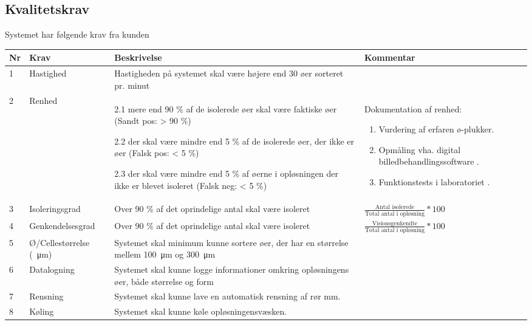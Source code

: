 \subsection{Kvalitetskrav}
\label{subsec:Kvalitetskrav}
Systemet har følgende krav fra kunden
\begin{center}
		\begin{longtable}{ | m{0.5cm} | m{3cm}| m{6cm}| m{4cm} |} 
			\hline
			\textbf{Nr} & \textbf{Krav} & \textbf{Beskrivelse} & \textbf{Kommentar} \\ 
			\hline
			1 & Hastighed & Hastigheden på systemet skal være højere end 30 øer sorteret pr. minut & \\
			\hline
			2 & Renhed & 2.1 mere end 90 \% af de isolerede øer skal være faktiske øer 
(Sandt pos: > 90 \%)

2.2 der skal være mindre end 5 \% af de isolerede øer, der ikke er øer
(Falsk pos: < 5 \%)

2.3 der skal være mindre end 5 \% af øerne i opløsningen der ikke er blevet isoleret
(Falsk neg: < 5 \%)
 & Dokumentation af renhed:
 \begin{enumerate}
 \item Vurdering af erfaren ø-plukker.
 \item Opmåling vha. digital billedbehandlingssoftware \citep{kskrav1}.
  \item Funktionstests i laboratoriet \citep{kskrav1} \citep{kskrav2}.
 \end{enumerate} \\
			\hline
			3 & Isoleringsgrad & Over 90 \% af det oprindelige antal skal være isoleret &
			 $\frac{\text{Antal isolerede}}{\text{Total antal i opløsning}} * 100$\\
			\hline
			4 & Genkendelsesgrad & Over 90 \% af det oprindelige antal skal være isoleret &
			 $\frac{\text{Visionsgenkendte}}{\text{Total antal i opløsning}} * 100$\\
			\hline
			5 & Ø/Cellestørrelse (\SI{}{\micro\metre}) & Systemet skal minimum kunne sortere øer, der 
har en størrelse mellem \SI{100}{\micro\metre} og \SI{300}{\micro\metre}
 &		\\
			\hline
			6 & Datalogning & Systemet skal kunne logge informationer omkring opløsningens øer, både størrelse og form & \\
			\hline
			7 & Rensning & Systemet skal kunne lave en automatisk rensning af rør mm. & \\
			\hline
			8 & Køling & Systemet skal kunne køle opløsningensvæsken. & \\
			\hline
		\end{longtable}
		
		
		
	\end{center}
	\pagebreak